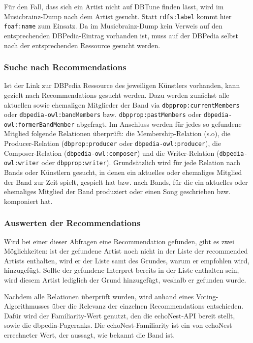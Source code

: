Für den Fall, dass sich ein Artist nicht auf DBTune finden lässt, wird im Musicbrainz-Dump nach dem Artist gesucht. Statt \texttt{rdfs:label} kommt hier \texttt{foaf:name} zum Einsatz. Da im Musicbrainz-Dump kein Verweis auf den entsprechenden DBPedia-Eintrag vorhanden ist, muss auf der DBPedia selbst nach der entsprechenden Ressource gesucht werden.


\subsubsection{Suche nach Recommendations}
Ist der Link zur DBPedia Ressource des jeweiligen Künstlers vorhanden, kann gezielt nach Recommendations gesucht werden. Dazu werden zunächst alle aktuellen sowie ehemaligen Mitglieder der Band via \texttt{dbpprop:currentMembers} oder \texttt{dbpedia-owl:bandMembers}  bzw. \texttt{dbpprop:pastMembers} oder \texttt{dbpedia-owl:formerBandMember} abgefragt. Im Anschluss werden für jedes so gefundene Mitglied folgende Relationen überprüft: die Membership-Relation (s.o), die Producer-Relation (\texttt{dbprop:producer} oder \texttt{dbpedia-owl:producer}), die Composer-Relation (\texttt{dbpedia-owl:composer}) und die Writer-Relation (\texttt{dbpedia-owl:writer} oder \texttt{dbpprop:writer}). Grundsätzlich wird für jede Relation nach Bands oder Künstlern gesucht, in denen ein aktuelles oder ehemaliges Mitglied der Band zur Zeit spielt, gespielt hat bzw. nach Bands, für die ein aktuelles oder ehemaliges Mitglied der Band produziert oder einen Song geschrieben bzw. komponiert hat. 

\subsubsection{Auswerten der Recommendations}
Wird bei einer dieser Abfragen eine Recommendation gefunden, gibt es zwei Möglichkeiten: ist der gefundene Artist noch nicht in der Liste der recommended Artists enthalten, wird er der Liste samt des Grundes, warum er empfohlen wird, hinzugefügt. Sollte der gefundene Interpret bereits in der Liste enthalten sein, wird diesem Artist lediglich der Grund hinzugefügt, weshalb er gefunden wurde. 

Nachdem alle Relationen überprüft wurden, wird anhand eines Voting-Algorithmusses über die Relevanz der einzelnen Recommendations entschieden. Dafür wird der Familiarity-Wert genutzt, den die echoNest-API bereit stellt, sowie die dbpedia-Pageranks. Die echoNest-Familiarity ist ein von echoNest errechneter Wert, der aussagt, wie bekannt die Band ist. %

